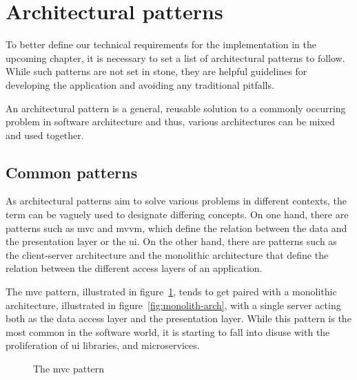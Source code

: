 \section{Architectural patterns}

To better define our technical requirements for the implementation in the upcoming chapter, it is necessary to set a list of architectural patterns to follow.
While such patterns are not set in stone, they are helpful guidelines for developing the application and avoiding any traditional pitfalls.

An architectural pattern is a general, reusable solution to a commonly occurring problem in software architecture and thus, various architectures can be mixed and used together.

\subsection{Common patterns}

As architectural patterns aim to solve various problems in different contexts, the term can be vaguely used to designate differing concepts.
On one hand, there are patterns such as \acrfull{mvc} and \acrfull{mvvm}, which define the relation between the data and the presentation layer or the \acrfull{ui}.
On the other hand, there are patterns such as the client-server architecture and the monolithic architecture that define the relation between the different access layers of an application.

The \acrshort{mvc} pattern, illustrated in figure~\ref{fig:mvc-arch}, tends to get paired with a monolithic architecture, illustrated in figure~\ref{fig:monolith-arch}, with a single server acting both as the data access layer and the presentation layer.
While this pattern is the most common in the software world, it is starting to fall into disuse with the proliferation of \acrshort{ui} libraries, and microservices.

\begin{figure}[H]
  \centerfloat

  \caption{The \acrshort{mvc} pattern}
  \label{fig:mvc-arch}
\end{figure}

